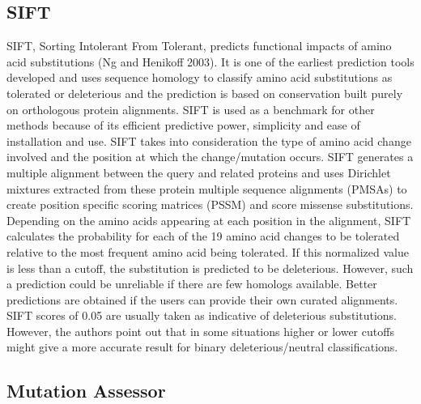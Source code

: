 \documentclass{article}
\begin{document}
\subsection{SIFT}

SIFT, Sorting Intolerant From Tolerant, predicts functional impacts of
amino acid substitutions (Ng and Henikoff 2003). It is one of the
earliest prediction tools developed and uses sequence homology to
classify amino acid substitutions as tolerated or deleterious and the
prediction is based on conservation built purely on orthologous
protein alignments. SIFT is used as a benchmark for other methods
because of its efficient predictive power, simplicity and ease of
installation and use. SIFT takes into consideration the type of amino
acid change involved and the position at which the change/mutation
occurs. SIFT generates a multiple alignment between the query and
related proteins and uses Dirichlet mixtures extracted from these
protein multiple sequence alignments (PMSAs) to create position
specific scoring matrices (PSSM) and score missense
substitutions. Depending on the amino acids appearing at each position
in the alignment, SIFT calculates the probability for each of the 19
amino acid changes to be tolerated relative to the most frequent amino
acid being tolerated. If this normalized value is less than a cutoff,
the substitution is predicted to be deleterious. However, such a
prediction could be unreliable if there are few homologs
available. Better predictions are obtained if the users can provide
their own curated alignments. SIFT scores of 0.05 are usually taken as
indicative of deleterious substitutions. However, the authors point
out that in some situations higher or lower cutoffs might give a more
accurate result for binary deleterious/neutral classifications.


\subsection{Mutation Assessor}
\end{document}
